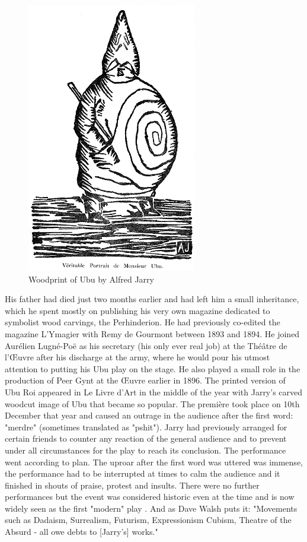 \begin{figure}[htb] %
  \centering
  \includegraphics[height=0.3\textheight]{images/ubu}
  \caption[Ubu]{Woodprint of Ubu by Alfred Jarry}
  \label{fig:UBU}
\end{figure}

His father had died just two months earlier and had left him a small inheritance, which he spent mostly on publishing his very own magazine dedicated to symbolist wood carvings, the Perhinderion. He had previously co-edited the magazine L'Ymagier with Remy de Gourmont between 1893 and 1894. He joined Aurélien Lugné-Poë as his secretary (his only ever real job) at the Théâtre de l'Œuvre after his discharge at the army, where he would pour his utmost attention to putting his Ubu play on the stage. He also played a small role in the production of Peer Gynt at the Œuvre earlier in 1896. The printed version of Ubu Roi appeared in Le Livre d'Art in the middle of the year with Jarry's carved woodcut image of Ubu that became so popular. The première took place on 10th December that year and caused an outrage in the audience after the first word: "merdre" (sometimes translated as "pshit"). Jarry had previously arranged for certain friends to counter any reaction of the general audience and to prevent under all circumstances for the play to reach its conclusion. The performance went according to plan. The uproar after the first word was uttered was immense, the performance had to be interrupted at times to calm the audience and it finished in shouts of praise, protest and insults. There were no further performances but the event was considered historic even at the time and is now widely seen as the first "modern" play \citep[p.168-169]{Brotchie2011}. And as Dave Walsh puts it: "Movements such as Dadaism, Surrealism, Futurism, Expressionism Cubism, Theatre of the Absurd - all owe debts to [Jarry's] works." \citep{Walsh2001}

